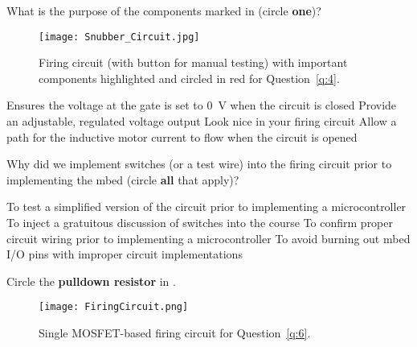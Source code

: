 \documentclass[addpoints,answers]{exam}
\begin{document}
\begin{questions}
\clearpage
\question[1]\label{q:4}
What is the purpose of the components marked in  (circle {\bf one})?
\begin{figure}[h]
\centering
	\texttt{[image: Snubber\_Circuit.jpg]}
	\caption{Firing circuit (with button for manual testing) with important components highlighted and circled in red for Question~\ref{q:4}.}
	\label{fig:Snubber}
\end{figure}
\begin{choices}
\choice Ensures the voltage at the gate is set to \SI{0}{\volt} when the circuit is closed
\choice Provide an adjustable, regulated voltage output  
\choice Look nice in your firing circuit
\CorrectChoice Allow a path for the inductive motor current to flow when the circuit is opened
\end{choices}














\question[1]
Why did we implement switches (or a test wire) into the firing circuit prior to implementing the mbed (circle {\bf all} that apply)?
\begin{choices}
\CorrectChoice To test a simplified version of the circuit prior to implementing a microcontroller
\choice To inject a gratuitous discussion of switches into the course
\CorrectChoice To confirm proper circuit wiring prior to implementing a microcontroller
\CorrectChoice To avoid burning out mbed I/O pins with improper circuit implementations
\end{choices}






\question[1]\label{q:6}
Circle the \textbf{pulldown resistor} in .
\begin{figure}[h]
\centering
	\texttt{[image: FiringCircuit.png]}
	\caption{Single MOSFET-based firing circuit for Question~\ref{q:6}.}
	\label{fig:FiringCircuitPulldown}
\end{figure}






\end{questions}
\end{document}
